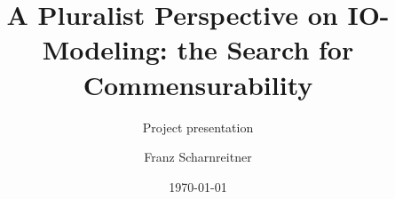 \documentclass[utf8,aspectratio=169,ngerman,english]{beamer}
\begin{document}


\title{A Pluralist Perspective on IO-Modeling: the Search for Commensurability}

\subtitle{Project presentation}

\author{Franz Scharnreitner}



\date{\today}





\end{document}
